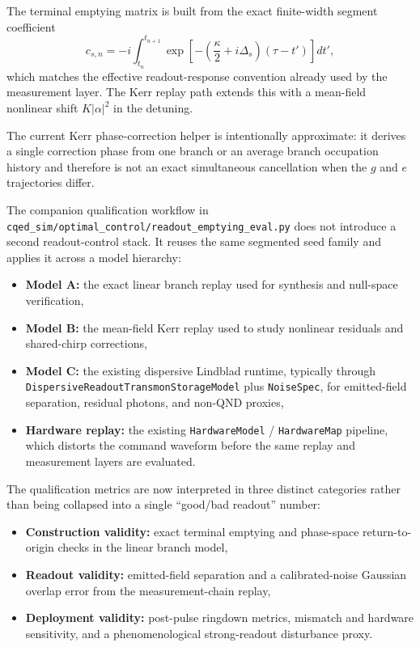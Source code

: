 \documentclass[11pt]{article}
\begin{document}
\noindent
The terminal emptying matrix is built from the exact finite-width segment
coefficient
\[
c_{s,n}
=
-i \int_{t_n}^{t_{n+1}}
\exp\!\left[-\left(\frac{\kappa}{2}+i\Delta_s\right)(\tau-t')\right] dt',
\]
which matches the effective readout-response convention already used by the
measurement layer. The Kerr replay path extends this with a mean-field nonlinear
shift \(K|\alpha|^2\) in the detuning.

\noindent
The current Kerr phase-correction helper is intentionally approximate: it derives a
single correction phase from one branch or an average branch occupation history and
therefore is not an exact simultaneous cancellation when the \(g\) and \(e\)
trajectories differ.

\noindent
The companion qualification workflow in
\texttt{cqed\_sim/optimal\_control/readout\_emptying\_eval.py} does not introduce
a second readout-control stack. It reuses the same segmented seed family and applies
it across a model hierarchy:
\begin{itemize}[leftmargin=1.5em]
  \item \textbf{Model A:} the exact linear branch replay used for synthesis and
  null-space verification,
  \item \textbf{Model B:} the mean-field Kerr replay used to study nonlinear
  residuals and shared-chirp corrections,
  \item \textbf{Model C:} the existing dispersive Lindblad runtime, typically through
  \texttt{DispersiveReadoutTransmonStorageModel} plus \texttt{NoiseSpec}, for
  emitted-field separation, residual photons, and non-QND proxies,
  \item \textbf{Hardware replay:} the existing \texttt{HardwareModel} /
  \texttt{HardwareMap} pipeline, which distorts the command waveform before the
  same replay and measurement layers are evaluated.
\end{itemize}

\noindent
The qualification metrics are now interpreted in three distinct categories rather
than being collapsed into a single ``good/bad readout'' number:
\begin{itemize}[leftmargin=1.5em]
  \item \textbf{Construction validity:} exact terminal emptying and phase-space
  return-to-origin checks in the linear branch model,
  \item \textbf{Readout validity:} emitted-field separation and a calibrated-noise
  Gaussian overlap error from the measurement-chain replay,
  \item \textbf{Deployment validity:} post-pulse ringdown metrics, mismatch and
  hardware sensitivity, and a phenomenological strong-readout disturbance proxy.
\end{itemize}
\end{document}
